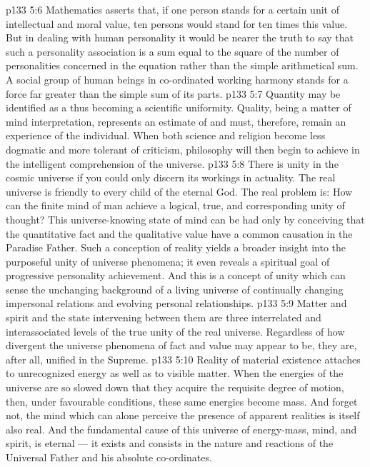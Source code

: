 \vs p133 5:6 Mathematics asserts that, if one person stands for a certain unit of intellectual and moral value, ten persons would stand for ten times this value. But in dealing with human personality it would be nearer the truth to say that such a personality association is a sum equal to the square of the number of personalities concerned in the equation rather than the simple arithmetical sum. A social group of human beings in co\hyp{}ordinated working harmony stands for a force far greater than the simple sum of its parts.
\vs p133 5:7 Quantity may be identified as a  thus becoming a scientific uniformity. Quality, being a matter of mind interpretation, represents an estimate of  and must, therefore, remain an experience of the individual. When both science and religion become less dogmatic and more tolerant of criticism, philosophy will then begin to achieve  in the intelligent comprehension of the universe.
\vs p133 5:8 There is unity in the cosmic universe if you could only discern its workings in actuality. The real universe is friendly to every child of the eternal God. The real problem is: How can the finite mind of man achieve a logical, true, and corresponding unity of thought? This universe\hyp{}knowing state of mind can be had only by conceiving that the quantitative fact and the qualitative value have a common causation in the Paradise Father. Such a conception of reality yields a broader insight into the purposeful unity of universe phenomena; it even reveals a spiritual goal of progressive personality achievement. And this is a concept of unity which can sense the unchanging background of a living universe of continually changing impersonal relations and evolving personal relationships.
\vs p133 5:9 Matter and spirit and the state intervening between them are three interrelated and interassociated levels of the true unity of the real universe. Regardless of how divergent the universe phenomena of fact and value may appear to be, they are, after all, unified in the Supreme.
\vs p133 5:10 Reality of material existence attaches to unrecognized energy as well as to visible matter. When the energies of the universe are so slowed down that they acquire the requisite degree of motion, then, under favourable conditions, these same energies become mass. And forget not, the mind which can alone perceive the presence of apparent realities is itself also real. And the fundamental cause of this universe of energy\hyp{}mass, mind, and spirit, is eternal --- it exists and consists in the nature and reactions of the Universal Father and his absolute co\hyp{}ordinates.
